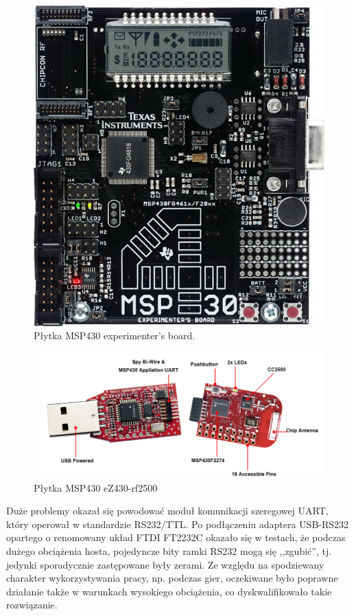 \begin{figure}
 \includegraphics[width=\textwidth]{gfx/exp43000}
 \caption{Płytka MSP430 experimenter's board.}
 \label{fig:msp430_exp}
\end{figure}

\begin{figure}
 \centering
 \includegraphics[width=\textwidth]{gfx/ez430-rf2500}
 \caption{Płytka MSP430 eZ430-rf2500}
 \label{fig:msp430_ez430}
\end{figure}

Duże problemy okazał się powodować moduł komunikacji szeregowej UART, który operował w standardzie RS232/TTL.
Po podłączeniu adaptera USB-RS232 opartego o renomowany układ FTDI FT2232C okazało się w testach, że podczas dużego obciążenia hosta, pojedyncze bity ramki RS232 mogą się ,,zgubić'', tj. jedynki sporadycznie zastępowane były zerami.
Ze względu na spodziewany charakter wykorzystywania pracy, np. podczas gier, oczekiwane było poprawne działanie także w warunkach wysokiego obciążenia, co dyskwalifikowało takie rozwiązanie.\\

